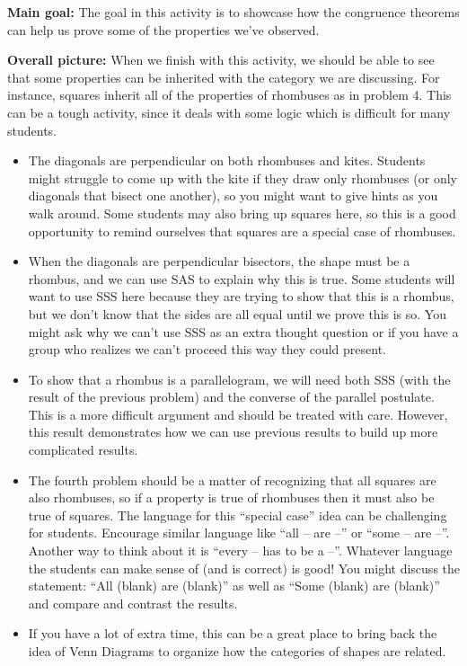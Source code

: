 \documentclass[nooutcomes,noauthor, handout]{ximera}
\begin{document}
\begin{instructorNotes}
{\bf Main goal: } The goal in this activity is to showcase how the congruence theorems can help us prove some of the properties we've observed.


{\bf Overall picture:} When we finish with this activity, we should be able to see that some properties can be inherited with the category we are discussing. For instance, squares inherit all of the properties of rhombuses as in problem 4.  This can be a tough activity, since it deals with some logic which is difficult for many students.


\begin{itemize}
	\item The diagonals are perpendicular on both rhombuses and kites. Students might struggle to come up with the kite if they draw only rhombuses (or only diagonals that bisect one another), so you might want to give hints as you walk around. Some students may also bring up squares here, so this is a good opportunity to remind ourselves that squares are a special case of rhombuses.
	\item When the diagonals are perpendicular bisectors, the shape must be a rhombus, and we can use SAS to explain why this is true. Some students will want to use SSS here because they are trying to show that this is a rhombus, but we don't know that the sides are all equal until we prove this is so. You might ask why we can't use SSS as an extra thought question or if you have a group who realizes we can't proceed this way they could present.
	\item To show that a rhombus is a parallelogram, we will need both SSS (with the result of the previous problem) and the converse of the parallel postulate. This is a more difficult argument and should be treated with care. However, this result demonstrates how we can use previous results to build up more complicated results.
	\item The fourth problem should be a matter of recognizing that all squares are also rhombuses, so if a property is true of rhombuses then it must also be true of squares. The language for this ``special case'' idea can be challenging for students. Encourage similar language like ``all -- are --'' or ``some -- are --''. Another way to think about it is ``every -- has to be a --''. Whatever language the students can make sense of (and is correct) is good! You might discuss the statement: ``All (blank) are (blank)'' as well as ``Some (blank) are (blank)'' and compare and contrast the results.
	\item If you have a lot of extra time, this can be a great place to bring back the idea of Venn Diagrams to organize how the categories of shapes are related.


\end{itemize}
\end{instructorNotes}
\end{document}
